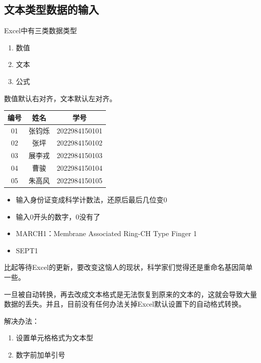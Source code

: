 \subsection{文本类型数据的输入}

Excel中有三类数据类型
\begin{enumerate}
    \item 数值
    \item 文本
    \item 公式
\end{enumerate}

数值默认右对齐，文本默认左对齐。

\begin{table}[ht]
    \centering
    \begin{tabular}{|c|c|c|}
    \hline
    编号 & 姓名 & 学号 \\ \hline
    01 & 张钧烁 & 2022984150101 \\ \hline
    02 & 张坪 & 2022984150102 \\ \hline
    03 & 展李戎 & 2022984150103 \\ \hline
    04 & 曹骏 & 2022984150104 \\ \hline
    05 & 朱高风 & 2022984150105 \\ \hline
    \end{tabular}
    \end{table}

    \begin{itemize}
      \item 输入身份证变成科学计数法，还原后最后几位变0
      \item 输入0开头的数字，0没有了
    \end{itemize}

    \begin{itemize}
      \item MARCH1：Membrane Associated Ring-CH Type Finger 1
      \item SEPT1
    \end{itemize}

    比起等待Excel的更新，要改变这恼人的现状，科学家们觉得还是重命名基因简单一些。

    一旦被自动转换，再去改成文本格式是无法恢复到原来的文本的，这就会导致大量数据的丢失。并且，目前没有任何办法关掉Excel默认设置下的自动格式转换。

    解决办法：
    \begin{enumerate}
        \item 设置单元格格式为文本型
        \item 数字前加单引号
    \end{enumerate}

